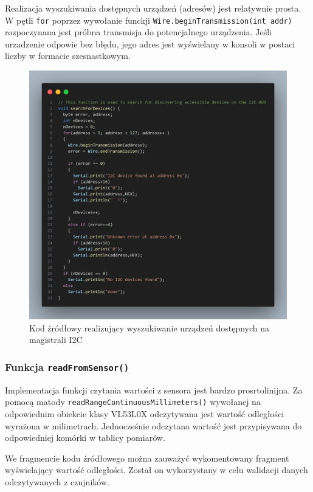 \documentclass{report}
\begin{document}
Realizacja wyszukiwania dostępnych urządzeń (adresów) jest relatywnie prosta. W pętli \texttt{for} poprzez wywołanie funckji \texttt{Wire.beginTransmission(int addr)} rozpoczynana jest próbna transmisja do potencjalnego urządzenia. Jeśli urzadzenie odpowie bez błędu, jego adres jest wyświelany w konsoli w postaci liczby w formacie szesnastkowym.
\begin{figure}[H]
    \centering
    \includegraphics[width=1.0\textwidth]{src/code_snaps/searchDevices.png}
    \caption{Kod źródłowy realizujący wyszukiwanie urządzeń dostępnych na magistrali I2C}
\end{figure}

\subsubsection*{Funkcja \texttt{readFromSensor()}}

Implementacja funkcji czytania wartości z sensora jest bardzo prosrtolinijna. Za pomocą matody \texttt{readRangeContinuousMillimeters()} wywołanej na odpowiednim obiekcie klasy VL53L0X odczytywana jest wartość odległości wyrażona w milimetrach. Jednocześnie odczytana wartość jest przypisywana do odpowiedniej komórki w tablicy pomiarów. 

We fragmencie kodu źródłowego można zauważyć wykomentowany fragment wyświelający wartość odległości. Został on wykorzystany w celu walidacji danych odczytywanych z czujników.
\end{document}
